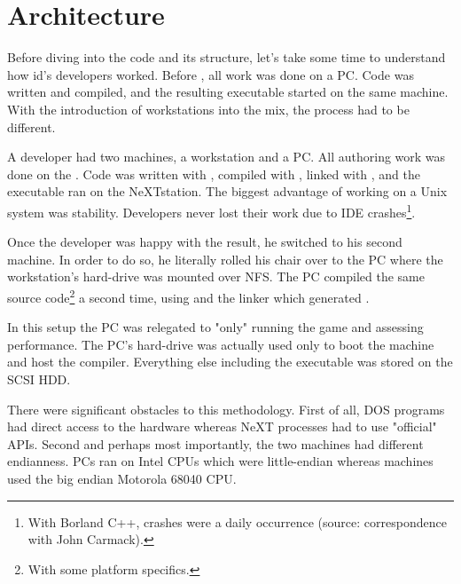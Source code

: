 \section{Architecture}
Before diving into the code and its structure, let's take some time to understand how id's developers worked. Before \doom, all work was done on a PC. Code was written and compiled, and the resulting executable started on the same machine. With the introduction of \NeXT workstations into the mix, the process had to be different.\\
\par
A developer had two machines, a \NeXT workstation and a PC. All authoring work was done on the \NeXTns{}. Code was written with , compiled with , linked with , and the executable ran on the NeXTstation. The biggest advantage of working on a Unix system was stability. Developers never lost their work due to IDE crashes\footnote{With Borland C++, crashes were a daily occurrence (source: correspondence with John Carmack).}.\\
\par
Once the developer was happy with the result, he switched to his second machine. In order to do so, he literally rolled his chair over to the PC where the \NeXT workstation's hard-drive was mounted over NFS. The PC compiled the same source code\footnote{With some platform specifics.} a second time, using  and the  linker which generated . \\
\par
 In this setup the PC was relegated to "only" running the game and assessing performance. The PC's hard-drive was actually used only to boot the machine and host the  compiler. Everything else including the  executable was stored on the \NeXT SCSI HDD.\\
\par
There were significant obstacles to this methodology. First of all, DOS programs had direct access to the hardware whereas NeXT processes had to use "official" APIs. Second and perhaps most importantly, the two machines had different endianness. PCs ran on Intel CPUs which were little-endian whereas \NeXT machines used the big endian Motorola 68040 CPU.\\
\vspace{2mm}
\par
\begin{figure}[H]
\centering
{}
\end{figure}
\par



